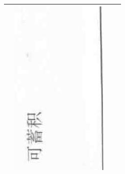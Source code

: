 \documentclass[10pt]{article}
\begin{document}
\begin{center}
\begin{tabular}{|c|c|c|c|}
 & \includegraphics[max width=\textwidth]{2024_07_05_645bb794a4d4f32ee0c8g-332(14)}
 \\
\hline

\end{tabular}
\end{center}
\end{document}
